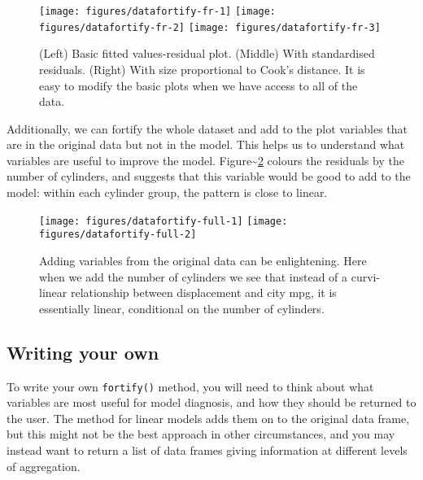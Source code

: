 \begin{figure}
\texttt{[image: figures/datafortify-fr-1]} \texttt{[image: figures/datafortify-fr-2]} \texttt{[image: figures/datafortify-fr-3]} \caption{(Left) Basic fitted values-residual plot. (Middle) With standardised residuals. (Right) With size proportional to Cook's distance. It is easy to modify the basic plots when we have access to all of the data.\label{fig:fortify-fr}}
\end{figure}

Additionally, we can fortify the whole dataset and add to the plot
variables that are in the original data but not in the model. This helps
us to understand what variables are useful to improve the model.
Figure\textasciitilde{}\ref{fig:fortify-full} colours the residuals by
the number of cylinders, and suggests that this variable would be good
to add to the model: within each cylinder group, the pattern is close to
linear.

\begin{Shaded}
\end{Shaded}

\begin{figure}
\texttt{[image: figures/datafortify-full-1]} \texttt{[image: figures/datafortify-full-2]} \caption{Adding variables from the original data can be enlightening. Here when we add the number of cylinders we see that instead of a curvi-linear relationship between displacement and city mpg, it is essentially linear, conditional on the number of cylinders.\label{fig:fortify-full}}
\end{figure}

\subsection{Writing your own}

To write your own \texttt{fortify()} method, you will need to think
about what variables are most useful for model diagnosis, and how they
should be returned to the user. The method for linear models adds them
on to the original data frame, but this might not be the best approach
in other circumstances, and you may instead want to return a list of
data frames giving information at different levels of aggregation.

